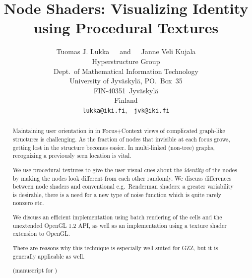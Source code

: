 \documentclass[twocolumn]{IV02}
\begin{document}
\newcommand{\url}[1]{{\fontsize{9pt}{8pt}\fontfamily{phv}\fontseries{c}\selectfont{#1}}}
\newcommand{\hyp}{\discretionary{}{}{}}



\title{
Node Shaders: Visualizing Identity using Procedural Textures
}

\author{
\parbox[t]{8.9cm}{\centering
             {Tuomas J. Lukka\ \ \ and\ \ \ Janne Veli Kujala}\\
  Hyperstructure Group\\
  Dept.~of Mathematical Information Technology\\
  University of Jyv\"askyl\"a, PO.~Box~35\\
  FIN-40351~Jyv\"askyl\"a\\
  Finland\\
  {\tt lukka@iki.fi},\ \ {\tt jvk@iki.fi}}
  }

\maketitle

\ifdraft
\textwidth 6.6cm
\columnwidth 8.6cm
\onecolumn
\marginparwidth 8.5cm
\fi

\def\gzz{GZZ}

\begin{abstract}
Maintaining user orientation in 
in Focus+Context views of complicated graph-like structures
is challenging.  
As the fraction of nodes that invisible at each focus grows,
getting lost in the structure becomes easier.
In multi-linked (non-tree) graphs,
recognizing a previously seen location is vital.

We use procedural textures to give the user visual cues about
the {\em identity} of the nodes by 
making the nodes look different from each other randomly.
We discuss differences between node shaders
and conventional e.g.~Renderman shaders: a greater variability
is desirable, there is a need for a new type of 
noise function which is quite rarely nonzero etc.

We discuss an efficient implementation using batch rendering of the
cells and the unextended OpenGL 1.2 API, as well as an implementation
using a texture shader extension to OpenGL.

There are reasons why this technique is especially well suited for \gzz,
but it is generally applicable as well.

(manuscript for \url{http://www.graphicslink.demon.co.uk/IV02/})
\end{abstract}
\end{document}
